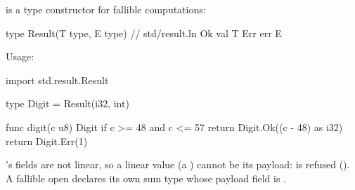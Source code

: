 \pnum
{} is a type constructor for fallible computations:

\begin{laincode}
type Result(T type, E type) {  // std/result.ln
    Ok  { val T }
    Err { err E }
}
\end{laincode}

\pnum
Usage:

\begin{laincode}
import std.result.{Result}

type Digit = Result(i32, int)

func digit(c u8) Digit {
    if c >= 48 and c <= 57 { return Digit.Ok((c - 48) as i32) }
    return Digit.Err(1)
}
\end{laincode}

\pnum
{}'s fields are not linear, so a linear value (a ) cannot be its payload:
 is refused (). A fallible open declares its own sum type
whose payload field is .
